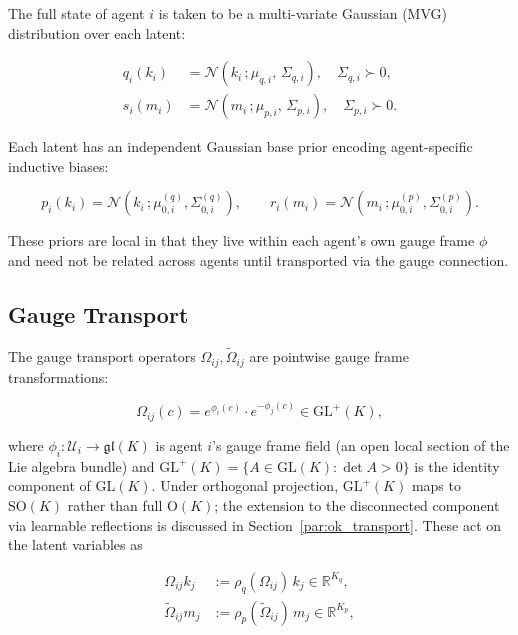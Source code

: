 \documentclass[twoside,11pt]{article}
\begin{document}
The full state of agent $i$ is taken to be a multi-variate Gaussian (MVG) distribution over each latent:

\begin{equation}
\begin{aligned}
q_i(k_i) &= \mathcal{N}(k_i\,;\mu_{q,i},\,\Sigma_{q,i}),
\quad \Sigma_{q,i} \succ 0,\\
s_i(m_i) &= \mathcal{N}(m_i\,;\mu_{p,i},\,\Sigma_{p,i}),
\quad \Sigma_{p,i} \succ 0.
\end{aligned}
\label{eq:gaussian_states}
\end{equation}

Each latent has an independent Gaussian base prior encoding agent-specific inductive biases:

\begin{equation}
p_i(k_i) = \mathcal{N}(k_i\,; \mu_{0,i}^{(q)}, \Sigma_{0,i}^{(q)}),
\qquad
r_i(m_i) = \mathcal{N}(m_i\,; \mu_{0,i}^{(p)}, \Sigma_{0,i}^{(p)}).
\label{eq:base_priors}
\end{equation}

These priors are local in that they live within each agent's own gauge frame $\phi$ and need not be related across agents until transported via the gauge connection.

\subsection{Gauge Transport}

The gauge transport operators $\Omega_{ij}, \tilde{\Omega}_{ij}$ are pointwise gauge frame transformations:

\begin{equation}
\Omega_{ij}(c) = e^{\phi_i(c)} \cdot e^{-\phi_j(c)} \in \mathrm{GL}^+(K),
\label{eq:gauge_frame_rotation}
\end{equation}

where $\phi_i: \mathcal{U}_i \to \mathfrak{gl}(K)$ is agent $i$'s gauge frame field (an open local section of the Lie algebra bundle) and $\mathrm{GL}^+(K) = \{A \in \mathrm{GL}(K) : \det A > 0\}$ is the identity component of $\mathrm{GL}(K)$.  Under orthogonal projection, $\mathrm{GL}^+(K)$ maps to $\mathrm{SO}(K)$ rather than full $\mathrm{O}(K)$; the extension to the disconnected component via learnable reflections is discussed in Section~\ref{par:ok_transport}. These act on the latent variables as

\begin{equation}
\begin{aligned}
\Omega_{ij} k_j
&:= \rho_q(\Omega_{ij}) \, k_j
\in \mathbb{R}^{K_q},\\
\tilde{\Omega}_{ij} m_j
&:= \rho_p(\tilde{\Omega}_{ij}) \, m_j
\in \mathbb{R}^{K_p},
\end{aligned}
\label{eq:gauge_action_on_vectors}
\end{equation}
\end{document}
